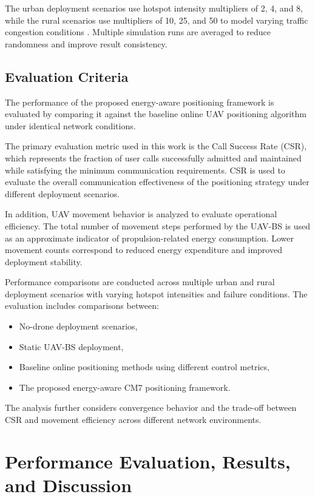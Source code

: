 \documentclass[12pt]{report}
\begin{document}
The urban deployment scenarios use hotspot intensity multipliers of 2, 4, and 8, while the rural scenarios use multipliers of 10, 25, and 50 to model varying traffic congestion conditions \cite{pijnappel2024online}. Multiple simulation runs are averaged to reduce randomness and improve result consistency.
\section{Evaluation Criteria}

The performance of the proposed energy-aware positioning framework is evaluated by comparing it against the baseline online UAV positioning algorithm under identical network conditions.

The primary evaluation metric used in this work is the Call Success Rate (CSR), which represents the fraction of user calls successfully admitted and maintained while satisfying the minimum communication requirements. CSR is used to evaluate the overall communication effectiveness of the positioning strategy under different deployment scenarios.

In addition, UAV movement behavior is analyzed to evaluate operational efficiency. The total number of movement steps performed by the UAV-BS is used as an approximate indicator of propulsion-related energy consumption. Lower movement counts correspond to reduced energy expenditure and improved deployment stability.

Performance comparisons are conducted across multiple urban and rural deployment scenarios with varying hotspot intensities and failure conditions. The evaluation includes comparisons between:
\begin{itemize}
    \item No-drone deployment scenarios,
    \item Static UAV-BS deployment,
    \item Baseline online positioning methods using different control metrics,
    \item The proposed energy-aware CM7 positioning framework.
\end{itemize}

The analysis further considers convergence behavior and the trade-off between CSR and movement efficiency across different network environments.

\chapter{Performance Evaluation, Results, and Discussion}
\label{ch:results}
\end{document}
